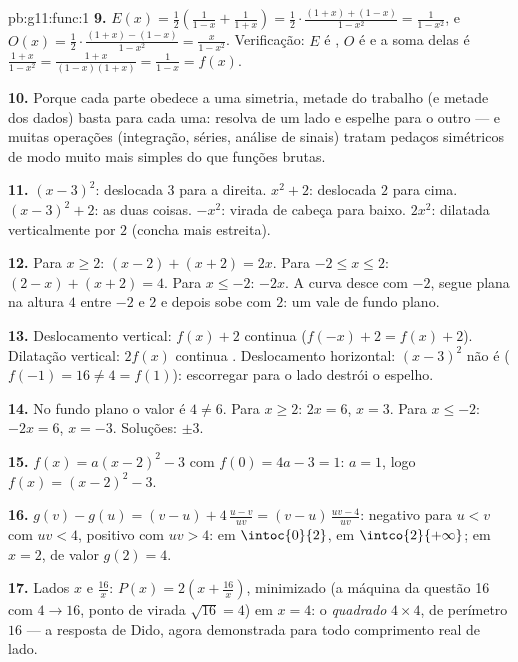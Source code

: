 \begin{solution}{pb:g11:func:1}
\textbf{9.} $E(x) = \frac12\left(\frac{1}{1 - x} + \frac{1}{1 +
x}\right) = \frac12 \cdot \frac{(1 + x) + (1 - x)}{1 - x^2}
= \frac{1}{1 - x^2}$, e
$O(x) = \frac12 \cdot \frac{(1 + x) - (1 - x)}{1 - x^2}
= \frac{x}{1 - x^2}$. Verificação: $E$ é , $O$ é  e a
soma delas é $\frac{1 + x}{1 - x^2} =
\frac{1 + x}{(1 - x)(1 + x)} = \frac{1}{1 - x} = f(x)$.

\textbf{10.} Porque cada parte obedece a uma simetria, metade do
trabalho (e metade dos dados) basta para cada uma: resolva de
um lado e espelhe para o outro --- e muitas operações
(integração, séries, análise de sinais) tratam pedaços
simétricos de modo muito mais simples do que funções brutas.

\textbf{11.} $(x-3)^2$: deslocada $3$ para a direita.
$x^2 + 2$: deslocada $2$ para cima. $(x-3)^2 + 2$: as duas
coisas. $-x^2$: virada de cabeça para baixo. $2x^2$: dilatada
verticalmente por $2$ (concha mais estreita).

\textbf{12.} Para $x \geq 2$: $(x - 2) + (x + 2) = 2x$. Para
$-2 \leq x \leq 2$: $(2 - x) + (x + 2) = 4$. Para $x \leq -2$:
$-2x$. A curva desce com  $-2$, segue plana
na altura $4$ entre $-2$ e $2$ e depois sobe com  $2$: um vale de fundo plano.

\textbf{13.} Deslocamento vertical: $f(x) + 2$ continua 
($f(-x) + 2 = f(x) + 2$). Dilatação vertical: $2f(x)$ continua
. Deslocamento horizontal: $(x - 3)^2$ não é 
($f(-1) = 16 \neq 4 = f(1)$): escorregar para o lado destrói o
espelho.

\textbf{14.} No fundo plano o valor é $4 \neq 6$. Para
$x \geq 2$: $2x = 6$, $x = 3$. Para $x \leq -2$: $-2x = 6$,
$x = -3$. Soluções: $\pm 3$.

\textbf{15.} $f(x) = a(x - 2)^2 - 3$ com $f(0) = 4a - 3 = 1$:
$a = 1$, logo $f(x) = (x - 2)^2 - 3$.

\textbf{16.} $g(v) - g(u) = (v - u) + 4\,\frac{u - v}{uv}
= (v - u)\,\frac{uv - 4}{uv}$: negativo para $u < v$ com
$uv < 4$, positivo com $uv > 4$:  em
$\intoc{0}{2}$,  em $\intco{2}{+\infty}$;  em
$x = 2$, de valor $g(2) = 4$.

\textbf{17.} Lados $x$ e $\frac{16}{x}$:
$P(x) = 2\left(x + \frac{16}{x}\right)$, minimizado (a máquina
da questão 16 com $4 \to 16$, ponto de virada $\sqrt{16} = 4$)
em $x = 4$: o \emph{quadrado} $4 \times 4$, de perímetro $16$
--- a resposta de Dido, agora demonstrada para todo comprimento
real de lado.


\end{solution}
